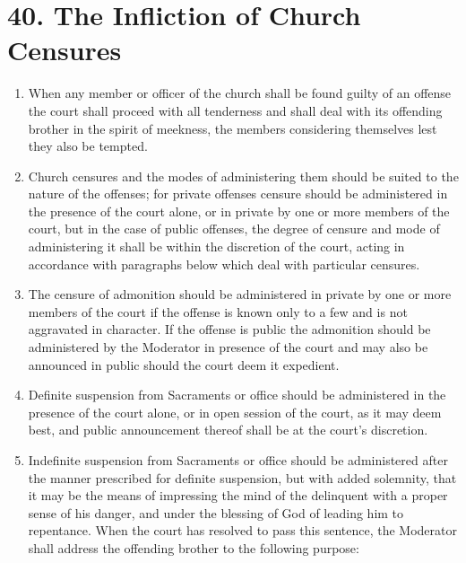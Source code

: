 \documentclass[
]{book}
\begin{document}
\hypertarget{the-infliction-of-church-censures}{%
\section*{40. The Infliction of Church Censures}\label{the-infliction-of-church-censures}}

\protect\hypertarget{chapter-slug-40-the-infliction-of-church-censures}{\href{}{}}

\begin{enumerate}
\def\labelenumi{\arabic{enumi}.}
\item
  \protect\hypertarget{40}{\href{}{}}When any member or officer of the church shall be found guilty of an offense the court shall proceed with all tenderness and shall deal with its offending brother in the spirit of meekness, the members considering themselves lest they also be tempted.
\item
  Church censures and the modes of administering them should be suited to the nature of the offenses; for private offenses censure should be administered in the presence of the court alone, or in private by one or more members of the court, but in the case of public offenses, the degree of censure and mode of administering it shall be within the discretion of the court, acting in accordance with paragraphs below which deal with particular censures.
\item
  The censure of admonition should be administered in private by one or more members of the court if the offense is known only to a few and is not aggravated in character. If the offense is public the admonition should be administered by the Moderator in presence of the court and may also be announced in public should the court deem it expedient.
\item
  Definite suspension from Sacraments or office should be administered in the presence of the court alone, or in open session of the court, as it may deem best, and public announcement thereof shall be at the court's discretion.
\item
  Indefinite suspension from Sacraments or office should be administered after the manner prescribed for definite suspension, but with added solemnity, that it may be the means of impressing the mind of the delinquent with a proper sense of his danger, and under the blessing of God of leading him to repentance. When the court has resolved to pass this sentence, the Moderator shall address the offending brother to the following purpose:


\end{enumerate}
\end{document}

